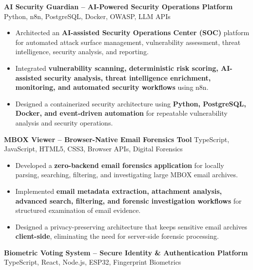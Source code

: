 \documentclass[a4paper,11pt]{article}
\newcommand{\resumeItem}[1]{
    \item \small{#1 \vspace{-2pt}}
}
\newcommand{\resumeProject}[2]{
    \vspace{2pt}
    \textbf{#1} \hfill {\small #2}
    \vspace{2pt}
}
\begin{document}
\vspace{1mm}

\resumeProject
{AI Security Guardian -- AI-Powered Security Operations Platform}
{Python, n8n, PostgreSQL, Docker, OWASP, LLM APIs}

\begin{itemize}[leftmargin=*]

\resumeItem{Architected an \textbf{AI-assisted Security Operations Center (SOC)} platform for automated attack surface management, vulnerability assessment, threat intelligence, security analysis, and reporting.}

\resumeItem{Integrated \textbf{vulnerability scanning, deterministic risk scoring, AI-assisted security analysis, threat intelligence enrichment, monitoring, and automated security workflows} using n8n.}

\resumeItem{Designed a containerized security architecture using \textbf{Python, PostgreSQL, Docker, and event-driven automation} for repeatable vulnerability analysis and security operations.}

\end{itemize}

\vspace{1mm}

\resumeProject
{MBOX Viewer -- Browser-Native Email Forensics Tool}
{TypeScript, JavaScript, HTML5, CSS3, Browser APIs, Digital Forensics}

\begin{itemize}[leftmargin=*]

\resumeItem{Developed a \textbf{zero-backend email forensics application} for locally parsing, searching, filtering, and investigating large MBOX email archives.}

\resumeItem{Implemented \textbf{email metadata extraction, attachment analysis, advanced search, filtering, and forensic investigation workflows} for structured examination of email evidence.}

\resumeItem{Designed a privacy-preserving architecture that keeps sensitive email archives \textbf{client-side}, eliminating the need for server-side forensic processing.}

\end{itemize}

\vspace{1mm}

\resumeProject
{Biometric Voting System -- Secure Identity \& Authentication Platform}
{TypeScript, React, Node.js, ESP32, Fingerprint Biometrics}
\end{document}
